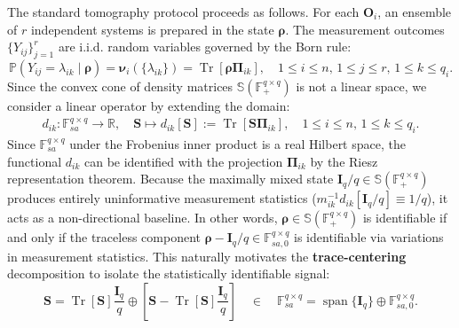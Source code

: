 \documentclass[noinfoline]{imsart}\setcounter{tocdepth}{2}
\renewcommand{\b}[1]{\mathbb{#1}} %
\newcommand{\m}[1]{\mathbf{#1}} %
\newcommand{\mb}[1]{\boldsymbol{#1}} %
\newcommand{\tr}[1]{\operatorname{Tr}\left[#1\right]}
\DeclareMathOperator*{\spann}{span}
\theoremstyle{plain}
\begin{document}
The standard tomography protocol proceeds as follows. For each $\m{O}_{i}$, an ensemble of $r$ independent systems is prepared in the state $\mb{\rho}$. The measurement outcomes $\{Y_{ij}\}_{j=1}^{r}$ are i.i.d. random variables governed by the Born rule:
\begin{equation*}
    \b{P}(Y_{ij} = \lambda_{ik}\mid\mb\rho) = \mb{\nu}_{i}(\{\lambda_{ik}\}) = \tr{\mb{\rho} \m{\Pi}_{ik}}, \quad 1 \le i \le n, \, 1 \le j \le r, \, 1 \le k \le q_{i}.
\end{equation*}
Since the convex cone of density matrices $\b{S}(\b{F}_{+}^{q \times q})$ is not a linear space, we consider a linear operator by extending the domain:
\begin{align*}
    d_{ik} : \b{F}_{sa}^{q \times q} \to \b{R}, \quad \m{S} \mapsto d_{ik}[\m{S}] := \tr{\m{S} \m{\Pi}_{ik}}, \quad 1 \le i \le n, \, 1 \le k \le q_{i}.
\end{align*}
Since $\b{F}_{sa}^{q \times q}$ under the Frobenius inner product is a real Hilbert space, the functional $d_{ik}$ can be identified with the projection $\m{\Pi}_{ik}$ by the Riesz representation theorem.
Because the maximally mixed state $\m{I}_{q}/q \in \b{S}(\b{F}_{+}^{q \times q})$ produces entirely uninformative measurement statistics ($m_{ik}^{-1} d_{ik} [\m{I}_{q}/q] \equiv 1/q$), it acts as a non-directional baseline. In other words, $\mb{\rho} \in \b{S}(\b{F}_{+}^{q \times q})$ is identifiable if and only if the traceless component $\mb{\rho} - \m{I}_{q}/q \in \b{F}_{sa, 0}^{q \times q}$ is identifiable via variations in measurement statistics. This naturally motivates the \textbf{trace-centering} decomposition to isolate the statistically identifiable signal:
\begin{equation}\label{eq:tr:center}
    \m{S} = \tr{\m{S}} \frac{\m{I}_{q}}{q} \oplus \left[ \m{S} - \tr{\m{S}} \frac{\m{I}_{q}}{q} \right] \quad \in \quad \b{F}_{sa}^{q \times q} = \spann\{\m{I}_{q}\} \oplus \b{F}_{sa, 0}^{q \times q}.
\end{equation}
\end{document}
